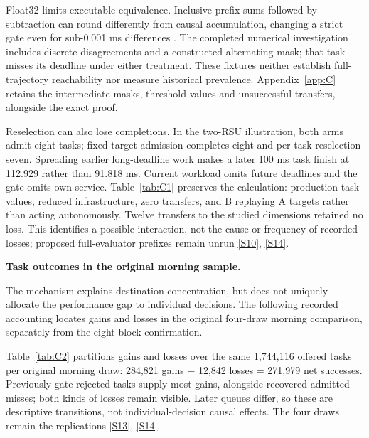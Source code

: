 \documentclass[12pt,a4paper]{article}
\begin{document}
Float32 limits executable equivalence. Inclusive prefix sums followed by subtraction can round differently from causal accumulation, changing a strict gate even for sub-0.001 ms differences \cite{ref41}. The completed numerical investigation includes discrete disagreements and a constructed alternating mask; that task misses its deadline under either treatment. These fixtures neither establish full-trajectory reachability nor measure historical prevalence. Appendix~\ref{app:C} retains the intermediate masks, threshold values and unsuccessful transfers, alongside the exact proof.

Reselection can also lose completions. In the two-RSU illustration, both arms admit eight tasks; fixed-target admission completes eight and per-task reselection seven. Spreading earlier long-deadline work makes a later 100 ms task finish at 112.929 rather than 91.818 ms. Current workload omits future deadlines and the gate omits own service. Table~\ref{tab:C1} preserves the calculation: production task values, reduced infrastructure, zero transfers, and B replaying A targets rather than acting autonomously. Twelve transfers to the studied dimensions retained no loss. This identifies a possible interaction, not the cause or frequency of recorded losses; proposed full-evaluator prefixes remain unrun \hyperref[source-s10]{[S10]}, \hyperref[source-s14]{[S14]}.

\textbf{Task outcomes in the original morning sample.}

The mechanism explains destination concentration, but does not uniquely allocate the performance gap to individual decisions. The following recorded accounting locates gains and losses in the original four-draw morning comparison, separately from the eight-block confirmation.

Table~\ref{tab:C2} partitions gains and losses over the same 1,744,116 offered tasks per original morning draw: 284,821 gains \ensuremath{-} 12,842 losses = 271,979 net successes. Previously gate-rejected tasks supply most gains, alongside recovered admitted misses; both kinds of losses remain visible. Later queues differ, so these are descriptive transitions, not individual-decision causal effects. The four draws remain the replications \hyperref[source-s13]{[S13]}, \hyperref[source-s14]{[S14]}.
\end{document}
